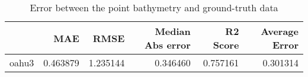 \begin{table}[h!]
\centering
\caption{Error between the point bathymetry and ground-truth data}
\label{tab:oahu3_lidar_error}
\begin{tabular}{lrrrrr}
\toprule
 & MAE & RMSE & Median Abs error & R2 Score & Average Error \\
\midrule
oahu3 & 0.463879 & 1.235144 & 0.346460 & 0.757161 & 0.301314 \\
\bottomrule
\end{tabular}
\end{table}
